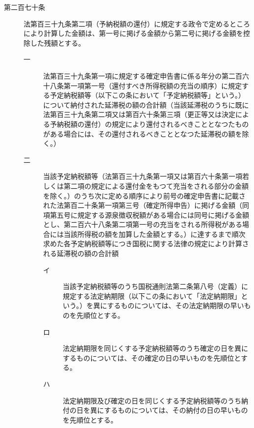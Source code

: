 \documentclass[twocolumn,a4j,10pt]{ltjtarticle}
\begin{document}
\begin{description}
\item[第二百七十条]法第百三十九条第二項（予納税額の還付）に規定する政令で定めるところにより計算した金額は、第一号に掲げる金額から第二号に掲げる金額を控除した残額とする。
\begin{description}
\item[一]法第百三十九条第一項に規定する確定申告書に係る年分の第二百六十八条第一項第一号（還付すべき所得税額の充当の順序）に規定する予定納税額等（以下この条において「予定納税額等」という。）について納付された延滞税の額の合計額（当該延滞税のうちに既に法第百三十九条第二項又は第百六十条第三項（更正等又は決定による予納税額の還付）の規定により還付されるべきこととなつたものがある場合には、その還付されるべきこととなつた延滞税の額を除く。）
\item[二]当該予定納税額等（法第百三十九条第一項又は第百六十条第一項若しくは第二項の規定による還付金をもつて充当をされる部分の金額を除く。）のうち次に定める順序により前号の確定申告書に記載された法第百二十条第一項第三号（確定所得申告）に掲げる金額（同項第五号に規定する源泉徴収税額がある場合には同号に掲げる金額とし、第二百六十八条第二項第一号の充当をされる所得税がある場合には当該所得税の額を加算した金額とする。）に達するまで順次求めた各予定納税額等につき国税に関する法律の規定により計算される延滞税の額の合計額
\begin{description}
\item[イ]当該予定納税額等のうち国税通則法第二条第八号（定義）に規定する法定納期限（以下この条において「法定納期限」という。）を異にするものについては、その法定納期限の早いものを先順位とする。
\item[ロ]法定納期限を同じくする予定納税額等のうち確定の日を異にするものについては、その確定の日の早いものを先順位とする。
\item[ハ]法定納期限及び確定の日を同じくする予定納税額等のうち納付の日を異にするものについては、その納付の日の早いものを先順位とする。
\end{description}
\end{description}
\end{description}
\end{document}
